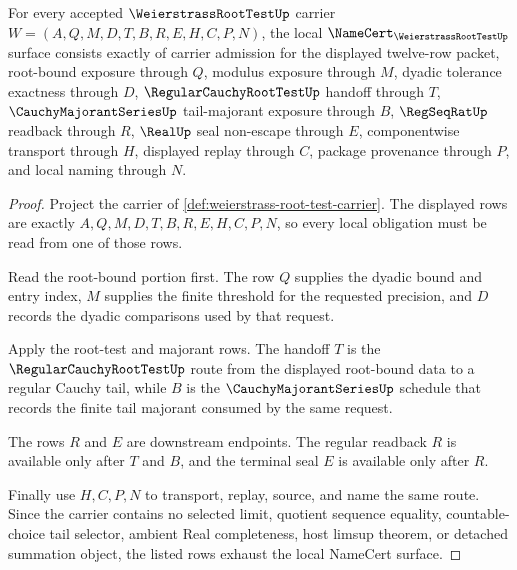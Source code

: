 \begin{theorem}
\label{thm:weierstrass-root-test-namecert-obligations}
For every accepted $\WeierstrassRootTestUp$ carrier $W=(A,Q,M,D,T,B,R,E,H,C,P,N)$, the local $\NameCert_{\WeierstrassRootTestUp}$ surface consists exactly of carrier admission for the displayed twelve-row packet, root-bound exposure through $Q$, modulus exposure through $M$, dyadic tolerance exactness through $D$, $\RegularCauchyRootTestUp$ handoff through $T$, $\CauchyMajorantSeriesUp$ tail-majorant exposure through $B$, $\RegSeqRatUp$ readback through $R$, $\RealUp$ seal non-escape through $E$, componentwise transport through $H$, displayed replay through $C$, package provenance through $P$, and local naming through $N$.
\end{theorem}
\begin{proof}
Project the carrier of \autoref{def:weierstrass-root-test-carrier}. The displayed rows are exactly $A,Q,M,D,T,B,R,E,H,C,P,N$, so every local obligation must be read from one of those rows.

Read the root-bound portion first. The row $Q$ supplies the dyadic bound and entry index, $M$ supplies the finite threshold for the requested precision, and $D$ records the dyadic comparisons used by that request.

Apply the root-test and majorant rows. The handoff $T$ is the $\RegularCauchyRootTestUp$ route from the displayed root-bound data to a regular Cauchy tail, while $B$ is the $\CauchyMajorantSeriesUp$ schedule that records the finite tail majorant consumed by the same request.

The rows $R$ and $E$ are downstream endpoints. The regular readback $R$ is available only after $T$ and $B$, and the terminal seal $E$ is available only after $R$.

Finally use $H,C,P,N$ to transport, replay, source, and name the same route. Since the carrier contains no selected limit, quotient sequence equality, countable-choice tail selector, ambient Real completeness, host limsup theorem, or detached summation object, the listed rows exhaust the local NameCert surface.
\end{proof}

